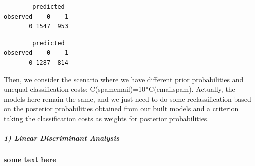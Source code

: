 \documentclass[
  11pt,
]{article}
\newenvironment{Shaded}{\begin{snugshade}}{\end{snugshade}}
\newcommand{\AttributeTok}[1]{\textcolor[rgb]{0.77,0.63,0.00}{#1}}
\newcommand{\DecValTok}[1]{\textcolor[rgb]{0.00,0.00,0.81}{#1}}
\newcommand{\FunctionTok}[1]{\textcolor[rgb]{0.00,0.00,0.00}{#1}}
\newcommand{\NormalTok}[1]{#1}
\newcommand{\OtherTok}[1]{\textcolor[rgb]{0.56,0.35,0.01}{#1}}
\newcommand{\SpecialCharTok}[1]{\textcolor[rgb]{0.00,0.00,0.00}{#1}}
\newcommand{\StringTok}[1]{\textcolor[rgb]{0.31,0.60,0.02}{#1}}
\begin{document}
\begin{verbatim}
        predicted
observed    0    1
       0 1547  953
\end{verbatim}

\begin{Shaded}
\end{Shaded}

\begin{verbatim}
        predicted
observed    0    1
       0 1287  814
\end{verbatim}

Then, we consider the scenario where we have different prior probabilities and unequal classification costs: C(spam\textbar email)=10*C(email\textbar spam). Actually, the models here remain the same, and we just need to do some reclassification based on the posterior probabilities obtained from our built models and a criterion taking the classification costs as weights for posterior probabilities.

\hypertarget{linear-discriminant-analysis-2}{%
\subparagraph{1) Linear Discriminant Analysis}\label{linear-discriminant-analysis-2}}

\textbf{some text here}

\begin{Shaded}
\end{Shaded}
\end{document}
